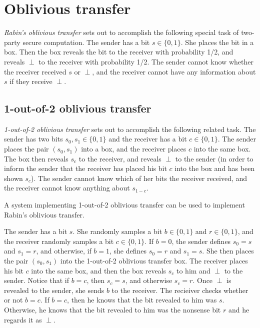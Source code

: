 \documentclass[12pt]{tufte-book}
\begin{document}
\section{Oblivious transfer}

\emph{Rabin's oblivious transfer} sets out to accomplish the following special task of two-party secure computation. The sender has a bit $s \in \{0,1\}$. She places the bit in a box. Then the box reveals the bit to the receiver with probability 1/2, and reveals $\perp$ to the receiver with probability 1/2. The sender cannot know whether the receiver received $s$ or $\perp$, and the receiver cannot have any information about $s$ if they receive $\perp$.

\subsection{1-out-of-2 oblivious transfer}
\emph{1-out-of-2 oblivious transfer} sets out to accomplish the following related task. The sender has two bits $s_0, s_1 \in \{0,1\}$ and the receiver has a bit $c \in \{0,1\}$. The sender places the pair $(s_0, s_1)$ into a box, and the receiver places $c$ into the same box. The box then reveals $s_c$ to the receiver, and reveals $\perp$ to the sender (in order to inform the sender that the receiver has placed his bit $c$ into the box and has been shown $s_c$). The sender cannot know which of her bits the receiver received, and the receiver cannot know anything about $s_{1-c}$.

\begin{lemma}
A system implementing 1-out-of-2 oblivious transfer can be used to implement Rabin's oblivious transfer.
\end{lemma}

\proof
The sender has a bit $s$. She randomly samples a bit $b \in \{0,1\}$ and $r \in \{0,1\}$, and the receiver randomly samples a bit $c \in \{0,1\}$. If $b = 0$, the sender defines $s_0 = s$ and $s_1 = r$, and otherwise, if $b = 1$, she defines $s_0 = r$ and $s_1 = s$. She then places the pair $(s_0, s_1)$ into the 1-out-of-2 oblivious transfer box. The receiver places his bit $c$ into the same box, and then the box reveals $s_c$ to him and $\perp$ to the sender. Notice that if $b = c$, then $s_c = s$, and otherwise $s_c = r$. Once $\perp$ is revealed to the sender, she sends $b$ to the receiver. The recieiver checks whether or not $b = c$. If $b = c$, then he knows that the bit revealed to him was $s$. Otherwise, he knows that the bit revealed to him was the nonsense bit $r$ and he regards it as $\perp$. \\
\end{document}
